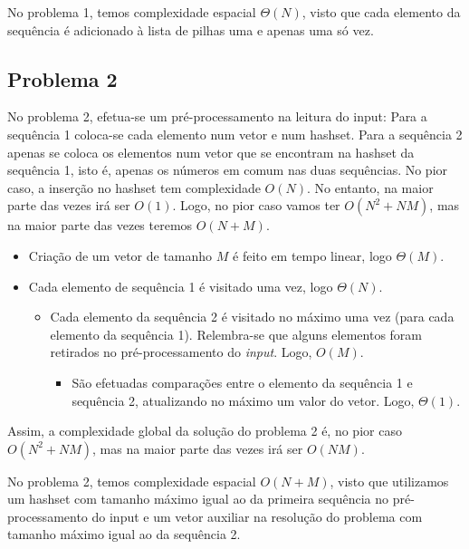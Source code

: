 \documentclass[12pt,a4paper]{article}
\begin{document}
  No problema 1, temos complexidade espacial $\Theta(N)$, visto que cada elemento da sequência é adicionado à lista de pilhas uma e apenas uma só vez.

  \subsection{Problema 2}

  No problema 2, efetua-se um pré-processamento na leitura do input:
    Para a sequência 1 coloca-se cada elemento num vetor e num hashset.
    Para a sequência 2 apenas se coloca os elementos num vetor que se encontram na hashset da sequência 1, isto é, apenas os números em comum nas duas sequências.
  No pior caso, a inserção no hashset tem complexidade $O(N)$.
  No entanto, na maior parte das vezes irá ser $O(1)$.
  Logo, no pior caso vamos ter $O(N^2 + NM)$, mas na maior parte das vezes teremos $O(N + M)$.

  \begin{itemize}
    \setlength{\itemsep}{0pt}
    \item Criação de um vetor de tamanho $M$ é feito em tempo linear, logo $\Theta(M)$.
    \item Cada elemento de sequência 1 é visitado uma vez, logo $\Theta(N)$.
    \begin{itemize}
      \setlength{\itemsep}{0pt}
      \item Cada elemento da sequência 2 é visitado no máximo uma vez (para cada elemento da sequência 1). Relembra-se que alguns elementos foram retirados no pré-processamento do \textit{input}. Logo, $O(M)$.
      \begin{itemize}
        \setlength{\itemsep}{0pt}
        \item São efetuadas comparações entre o elemento da sequência 1 e sequência 2, atualizando no máximo um valor do vetor. Logo, $\Theta(1)$.
      \end{itemize}
    \end{itemize}
  \end{itemize}

  Assim, a complexidade global da solução do problema 2 é, no pior caso $O(N^2 + NM)$, mas na maior parte das vezes irá ser $O(NM)$.

  No problema 2, temos complexidade espacial $O(N + M)$, visto que utilizamos um hashset com tamanho máximo igual ao da primeira sequência no pré-processamento do input e um vetor auxiliar na resolução do problema com tamanho máximo igual ao da sequência 2.
\end{document}
